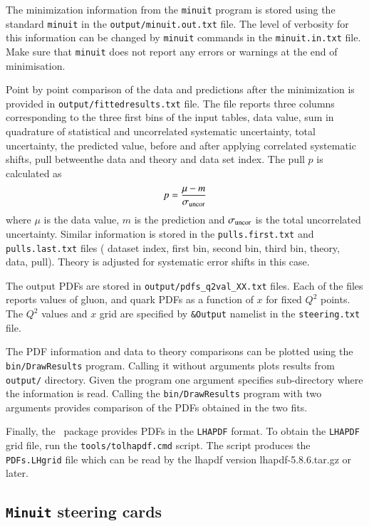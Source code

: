   The minimization information from the {\tt minuit} program is stored using the standard {\tt minuit} in the {\tt output/minuit.out.txt}
  file. The level of verbosity for this information can be changed by {\tt minuit} commands
  in the {\tt minuit.in.txt} file. Make sure that {\tt minuit} does not report any errors
  or warnings at the end of minimisation.
  
  Point by point comparison of the data and predictions after the minimization 
  is provided in {\tt output/fittedresults.txt} file. The file reports three columns
  corresponding to the three first bins of the input tables, data value, sum in 
  quadrature of statistical and uncorrelated systematic uncertainty, total
  uncertainty, the predicted value, before and after applying correlated systematic shifts,
  pull betweenthe  data and theory and 
  data set index. The pull $p$ is calculated as 
  \begin{equation}
      p = \frac{ \mu - m} {\sigma_{\rm uncor}}
  \end{equation}
  where $\mu$ is the data value, $m$ is the prediction and $\sigma_{\rm uncor}$ is the total
  uncorrelated uncertainty.
  Similar information is stored in the {\tt pulls.first.txt} and {\tt pulls.last.txt} files
  ( dataset index, first bin, second bin, third bin, theory, data, pull).
  Theory is  adjusted for systematic error shifts in this case.

  The output PDFs are stored in  {\tt output/pdfs\_q2val\_XX.txt} files.
  Each of the files reports values of gluon, and quark PDFs as a function of $x$
  for fixed $Q^2$ points. The $Q^2$ values and $x$ grid are specified by 
  {\tt \&Output} namelist in the {\tt steering.txt} file.
  
  The PDF information and data to theory comparisons can be plotted using 
  the {\tt bin/DrawResults} program.  Calling it without arguments plots results from
  {\tt output/} directory. Given the program one argument specifies sub-directory 
  where the information is read. Calling the {\tt bin/DrawResults} program with two
  arguments provides comparison of the PDFs obtained in the two fits.
  
  Finally, the \fitter\ package provides PDFs in the {\tt LHAPDF} format. To obtain the
  {\tt LHAPDF} grid file, run the {\tt tools/tolhapdf.cmd} script. The script produces 
  the {\tt PDFs.LHgrid} file which can be read by the lhapdf version lhapdf-5.8.6.tar.gz
  or later.
\subsection{{\tt Minuit} steering cards}

